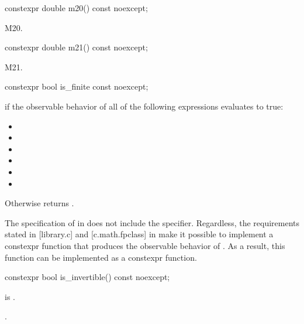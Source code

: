 %
\begin{itemdecl}
constexpr double m20() const noexcept;
\end{itemdecl}
\begin{itemdescr}
\pnum
\returns
M20.
\end{itemdescr}

%
\begin{itemdecl}
constexpr double m21() const noexcept;
\end{itemdecl}
\begin{itemdescr}
\pnum
\returns
M21.
\end{itemdescr}

%
\begin{itemdecl}
constexpr bool is_finite const noexcept;
\end{itemdecl}
\begin{itemdescr}
\pnum
\returns
{} if the observable behavior of all of the following expressions evaluates to true:
\begin{itemize}
\item {}
\item {}
\item {}
\item {}
\item {}
\item {}
\end{itemize}

\pnum
Otherwise returns .

\pnum
\begin{note}
The specification of  in \cppseventeen does not include the  specifier. Regardless, the requirements stated in [library.c] and [c.math.fpclass] in \cppseventeen make it possible to implement a constexpr function that produces the observable behavior of . As a result, this function can be implemented as a constexpr function.
\end{note}
\end{itemdescr}

%
\begin{itemdecl}
constexpr bool is_invertible() const noexcept;
\end{itemdecl}
\begin{itemdescr}
\pnum
\requires
{} is .

\pnum
\returns
{}.
\end{itemdescr}

